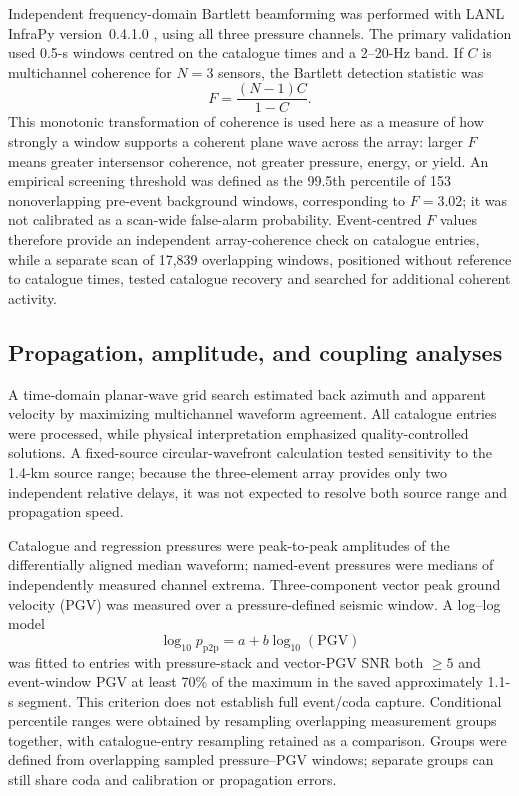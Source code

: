 \documentclass[]{seismica}
\begin{document}
Independent frequency-domain Bartlett beamforming was performed with LANL
InfraPy version~0.4.1.0 \citep{webster_infrapy_2025}, using all three pressure
channels. The primary validation used 0.5-s windows centred on the catalogue
times and a 2--20-Hz band. If $C$ is multichannel coherence for $N=3$
sensors, the Bartlett detection statistic was
\begin{equation}
 F=\frac{(N-1)C}{1-C}.
\end{equation}
This monotonic transformation of coherence is used here as a measure of how
strongly a window supports a coherent plane wave across the array: larger
$F$ means greater intersensor coherence, not greater pressure, energy, or
yield. An empirical screening threshold was defined as the 99.5th percentile
of 153 nonoverlapping pre-event background windows, corresponding to $F=3.02$;
it was not calibrated as a scan-wide false-alarm probability. Event-centred
$F$ values therefore provide an independent array-coherence check on catalogue
entries, while a separate scan of 17,839 overlapping windows, positioned
without reference to catalogue times, tested catalogue recovery and searched
for additional coherent activity.

\subsection{Propagation, amplitude, and coupling analyses}

A time-domain planar-wave grid search estimated back azimuth and apparent
velocity by maximizing multichannel waveform agreement. All catalogue entries
were processed, while physical interpretation emphasized quality-controlled
solutions. A fixed-source circular-wavefront calculation tested sensitivity to
the 1.4-km source range; because the three-element array provides only two
independent relative delays, it was not expected to resolve both source range
and propagation speed.

Catalogue and regression pressures were peak-to-peak amplitudes of the
differentially aligned median waveform; named-event pressures were medians
of independently measured channel extrema. Three-component vector peak ground
velocity (PGV) was measured over a pressure-defined seismic window. A log--log model
\begin{equation}
 \log_{10}p_{\mathrm{p2p}}=a+b\log_{10}(\mathrm{PGV})
 \label{eq:power_law}
\end{equation}
was fitted to entries with pressure-stack and vector-PGV SNR both $\geq5$
and event-window PGV at least 70\% of the maximum in the saved approximately
1.1-s segment. This criterion does not establish full event/coda capture. Conditional percentile ranges were obtained by
resampling overlapping measurement groups together, with catalogue-entry
resampling retained as a comparison. Groups were defined from overlapping
sampled pressure--PGV windows; separate groups can still share coda and
calibration or propagation errors.
\end{document}
